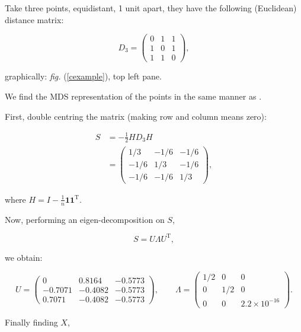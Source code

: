 \documentclass[a4paper,10pt]{article}
\newcommand{\fig}[1]{\emph{fig.} (\ref{#1})}
\newcommand{\cross}{\times}
\begin{document}
Take three points, equidistant, 1 unit apart, they have the following (Euclidean) distance matrix:

\begin{equation*}
D_3 = \begin{pmatrix} 0 & 1& 1\\1 & 0 & 1\\ 1 & 1 & 0\end{pmatrix},
\end{equation*}

graphically: \fig{cexample}, top left pane.

We find the MDS representation of the points in the same manner as \cite{diaconis08}.

First, double centring the matrix (making row and column means zero):

\begin{equation*}
\begin{aligned}
S &= -\frac{1}{2} HD_3H\\
    &= \begin{pmatrix} 1/3 & -1/6 & -1/6\\-1/6 & 1/3 & -1/6\\ -1/6 & -1/6 & 1/3\end{pmatrix},
\end{aligned}
\end{equation*}

where $H=I-\frac{1}{n}\mathbf{1}\mathbf{1}^\text{T}$.

Now, performing an eigen-decomposition on $S$,

\begin{equation*}
S = U \Lambda U^\text{T},
\end{equation*}

we obtain:

\begin{equation*}
U = \begin{pmatrix} 
	0 & 0.8164 & -0.5773\\
	-0.7071 & -0.4082 & -0.5773\\ 
	0.7071 & -0.4082 & -0.5773
	\end{pmatrix},\qquad
\Lambda = \begin{pmatrix} 
	1/2 & 0 & 0\\
	0 & 1/2 & 0\\ 
	0 & 0 & 2.2\cross10^{-16}
\end{pmatrix}.
\end{equation*}

Finally finding $X$,
\end{document}

